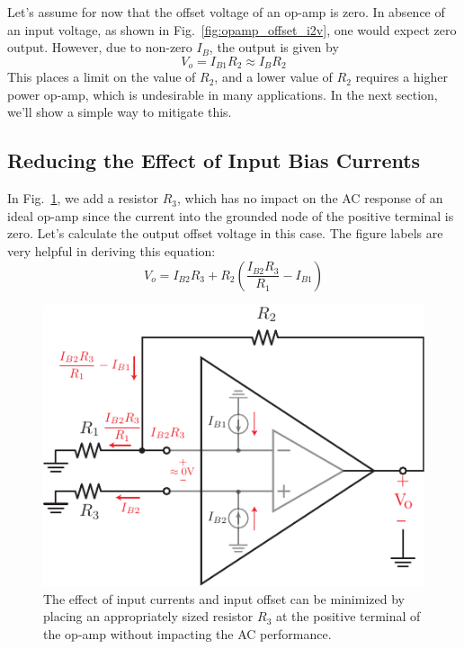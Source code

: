 Let's assume for now that the offset voltage of an op-amp is zero.  In absence of an input voltage, as shown in Fig.~\ref{fig:opamp_offset_i2v}, one would expect zero output.  However, due to non-zero $I_B$, the output is given by
%
\begin{equation}
      V_o = I_{B1} R_2 \approx I_B R_2 
      \label{eq:off1}
\end{equation}
%
This places a limit on the value of $R_2$, and a lower value of $R_2$ requires a higher power op-amp, which is undesirable in many applications.  In the next section, we'll show a simple way to mitigate this.



\subsection{Reducing the Effect of Input Bias Currents}

In Fig.~\ref{fig:opamp_offset_reduce}, we add a resistor $R_3$, which has no impact on the AC response of an ideal op-amp since the current into the grounded node of the positive terminal is zero.  Let's calculate the output offset voltage in this case.  The figure labels are very helpful in deriving this equation:
%
\begin{equation}
      V_o = I_{B2} R_3 + R_2 \left(  \frac{I_{B2}R_3}{R_1} - I_{B1}  \right)
\end{equation}
%



\begin{figure}[tb]
\begin{center}
\includegraphics[scale=1]{opamp_offset_reduce}
\end{center}
\caption{The effect of input currents and input offset can be minimized by placing an appropriately sized resistor $R_3$ at the positive terminal of the op-amp without impacting the AC performance.} \label{fig:opamp_offset_reduce}
\end{figure}

